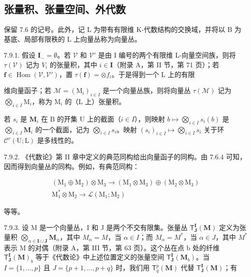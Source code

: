 \subsection{张量积、张量空间、外代数}

保留 7.6 的记号。此外，记 L 为带有有限维 K-代数结构的交换域，并将以 B 为基底、局部有限秩的 L 上向量丛称为向量丛。

7.9.1. 假设 \(\mathbf{I}_{-} = \emptyset\)。若 \(\mathcal{V}\) 和 \(\mathcal{V}'\) 是由 I 编号的两个有限维 L-向量空间族，则将 \(\tau(\mathcal{V})\) 记为 \(V_{i}\) 的张量积，其中 \(i \in \mathbf{I}\)（附录 A，第 II 节，第 71 页）；若 \(\mathbf{f} \in \operatorname{Hom}(\mathcal{V}, \mathcal{V}')\)，置 \(\tau(\mathbf{f}) = \otimes f_{i}\)。于是得到一个 L 上的有限

维向量函子；若 \(\mathcal{M} = (\mathrm{M}_{i})_{i\in I}\) 是一个向量丛族，则将向量丛 \(\tau(\mathcal{M})\) 记为 \(\bigotimes_{i\in I}\mathrm{M}_{i}\)，称为 \(\mathrm{M}_{i}\) 的（L 上）张量积。

若 \(s_i\) 是 \(\mathbf{M}_i\) 在 B 的开集 U 上的截面（\(i \in I\)），则映射 \(b \mapsto \bigotimes_{i \in I} s_i(b)\) 是 \(\bigotimes_{i \in I} \mathbf{M}_i\) 的一个截面，记为 \(\bigotimes_{i \in I} s_i\)。映射 \((s_i)_{i \in I} \mapsto \bigotimes_{i \in I} s_i\) 关于环 \(\mathcal{C}^r(\mathrm{U}; \mathrm{L})\) 是多线性的。

7.9.2. 《代数论》第 II 章中定义的典范同构给出向量函子的同构。由 7.6.4 可知，因而得到向量丛的同构。例如，有典范同构：

\[
\begin{array}{c} (\mathrm{M} _ {1} \oplus \mathrm{M} _ {2}) \otimes \mathrm{M} _ {3} \longrightarrow (\mathrm{M} _ {1} \otimes \mathrm{M} _ {3}) \oplus (\mathrm{M} _ {2} \otimes \mathrm{M} _ {3}) \\ \mathrm{M} _ {1} ^ {*} \otimes \mathrm{M} _ {2} \longrightarrow \mathcal {L} (\mathrm{M} _ {1}; \mathrm{M} _ {2}) \end{array}
\]

等等。

7.9.3. 设 M 是一个向量丛，I 和 J 是两个不交有限集。张量丛 \(\mathsf{T}_{\mathbf{J}}^{\mathbf{I}}(\mathbf{M})\) 定义为张量积 \(\bigotimes_{\alpha\in\mathbf{I}\cup\mathbf{J}}\mathbf{M}_{\alpha}\)，其中 \(M_{\alpha}=M\)，当 \(\alpha\in I\)；而 \(M_{\alpha}=M^{*}\)，当 \(\alpha\in J\)，其中 \(M^{*}\) 表示 M 的对偶（附录 A，第 III 节，第 63 页）。这个丛在点 b 处的纤维 \(\mathsf{T}_{\mathbf{J}}^{\mathbf{I}}(\mathbf{M})_{b}\) 等于《代数论》中上述位置定义的张量空间 \(\mathsf{T}_{\mathbf{J}}^{\mathbf{I}}(\mathbf{M}_{b})\)。当 \(I=\{1,\ldots,p\}\) 且 \(J=\{p+1,\ldots,p+q\}\) 时，我们用 \(\mathsf{T}_{q}^{p}(\mathbf{M})\) 代替 \(\mathsf{T}_{\mathbf{J}}^{\mathbf{I}}(\mathbf{M})\)；有

